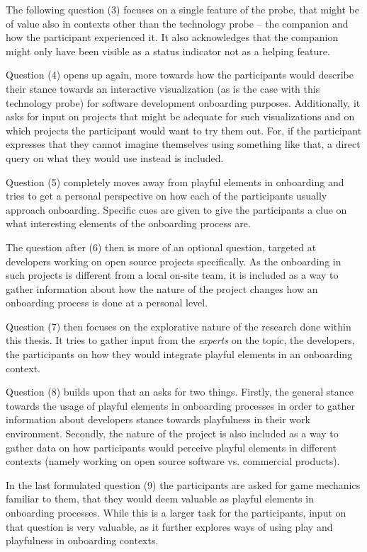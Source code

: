 The following question (3) focuses on a single feature of the probe, that might be of value also in contexts other than the technology probe -- the companion and how the participant experienced it. It also acknowledges that the companion might only have been visible as a status indicator not as a helping feature.

Question (4) opens up again, more towards how the participants would describe their stance towards an interactive visualization (as is the case with this technology probe) for software development onboarding purposes. Additionally, it asks for input on projects that might be adequate for such visualizations and on which projects the participant would want to try them out. For, if the participant expresses that they cannot imagine themselves using something like that, a direct query on what they would use instead is included.

Question (5) completely moves away from playful elements in onboarding and tries to get a personal perspective on how each of the participants usually approach onboarding. Specific cues are given to give the participants a clue on what interesting elements of the onboarding process are.

The question after (6) then is more of an optional question, targeted at developers working on open source projects specifically. As the onboarding in such projects is different from a local on-site team, it is included as a way to gather information about how the nature of the project changes how an onboarding process is done at a personal level.

Question (7) then focuses on the explorative nature of the research done within this thesis. It tries to gather input from the \textit{experts} on the topic, the developers, the participants on how they would integrate playful elements in an onboarding context.

Question (8) builds upon that an asks for two things. Firstly, the general stance towards the usage of playful elements in onboarding processes in order to gather information about developers stance towards playfulness in their work environment. Secondly, the nature of the project is also included as a way to gather data on how participants would perceive playful elements in different contexts (namely working on open source software vs. commercial products).

In the last formulated question (9) the participants are asked for game mechanics familiar to them, that they would deem valuable as playful elements in onboarding processes. While this is a larger task for the participants, input on that question is very valuable, as it further explores ways of using play and playfulness in onboarding contexts.

